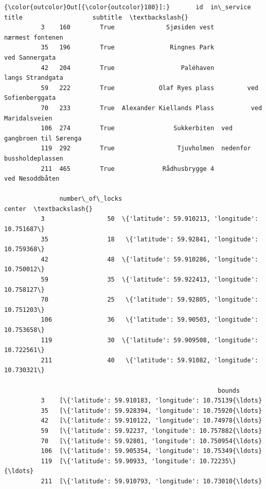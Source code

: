 \documentclass[11pt]{article}
\begin{document}
\begin{Verbatim}[commandchars=\\\{\}]
{\color{outcolor}Out[{\color{outcolor}180}]:}       id  in\_service                      title                   subtitle  \textbackslash{}
          3    160        True              Sjøsiden vest           nærmest fontenen   
          35   196        True               Ringnes Park             ved Sannergata   
          42   204        True                  Paléhaven           langs Strandgata   
          59   222        True            Olaf Ryes plass         ved Sofienberggata   
          70   233        True  Alexander Kiellands Plass          ved Maridalsveien   
          106  274        True                Sukkerbiten  ved gangbroen til Sørenga   
          119  292        True                 Tjuvholmen  nedenfor bussholdeplassen   
          211  465        True             Rådhusbrygge 4            ved Nesoddbåten   
          
               number\_of\_locks                                           center  \textbackslash{}
          3                 50  \{'latitude': 59.910213, 'longitude': 10.751687\}   
          35                18   \{'latitude': 59.92841, 'longitude': 10.759368\}   
          42                48  \{'latitude': 59.910286, 'longitude': 10.750012\}   
          59                35  \{'latitude': 59.922413, 'longitude': 10.758127\}   
          70                25   \{'latitude': 59.92805, 'longitude': 10.751203\}   
          106               36   \{'latitude': 59.90503, 'longitude': 10.753658\}   
          119               30  \{'latitude': 59.909508, 'longitude': 10.722561\}   
          211               40   \{'latitude': 59.91082, 'longitude': 10.730321\}   
          
                                                          bounds  
          3    [\{'latitude': 59.910183, 'longitude': 10.75139{\ldots}  
          35   [\{'latitude': 59.928394, 'longitude': 10.75920{\ldots}  
          42   [\{'latitude': 59.910122, 'longitude': 10.74978{\ldots}  
          59   [\{'latitude': 59.92237, 'longitude': 10.757882{\ldots}  
          70   [\{'latitude': 59.92801, 'longitude': 10.750954{\ldots}  
          106  [\{'latitude': 59.905354, 'longitude': 10.75349{\ldots}  
          119  [\{'latitude': 59.90933, 'longitude': 10.72235\}{\ldots}  
          211  [\{'latitude': 59.910793, 'longitude': 10.73010{\ldots}  
\end{Verbatim}
            
\end{document}
